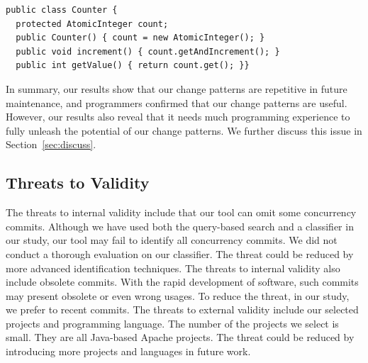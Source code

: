 \begin{lstlisting}
public class Counter {
  protected AtomicInteger count;
  public Counter() { count = new AtomicInteger(); }
  public void increment() { count.getAndIncrement(); }
  public int getValue() { return count.get(); }}
\end{lstlisting}





In summary, our results show that our change patterns are repetitive in future maintenance, and programmers confirmed that our change patterns are useful. However, our results also reveal that it needs much programming experience to fully unleash the potential of our change patterns. We further discuss this issue in Section~\ref{sec:discuss}.



\subsection{Threats to Validity}

The threats to internal validity include that our tool can omit some concurrency commits. Although we have used both the query-based search and a classifier in our study, our tool may fail to identify all concurrency commits. We did not conduct a thorough evaluation on our classifier. The threat could be reduced by more advanced identification techniques. The threats to internal validity also include obsolete commits. With the rapid development of software, such commits may present obsolete or even wrong usages. To reduce the threat, in our study, we prefer to recent commits. The threats to external validity include our selected projects and programming language. The number of the projects we select is small. They are all Java-based Apache projects. The threat could be reduced by introducing more projects and languages in future work.


